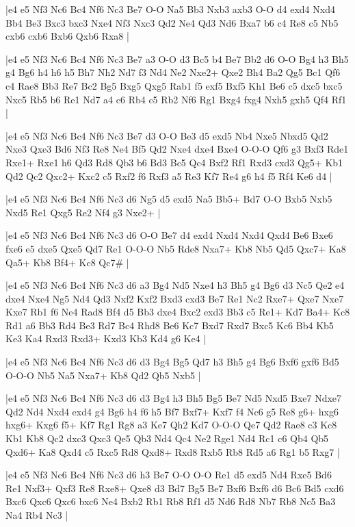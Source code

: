 \whitename{}
\blackname{}
\makegametitle
|e4 e5 Nf3 Nc6 Bc4 Nf6 Nc3 Be7 O-O Na5 Bb3 Nxb3 axb3 O-O d4 exd4 Nxd4 Bb4 Be3 Bxc3 bxc3 Nxe4 Nf3 Nxc3 Qd2 Ne4 Qd3 Nd6 Bxa7 b6 c4 Re8 c5 Nb5 cxb6 cxb6 Bxb6 Qxb6 Rxa8  |

\whitename{}
\blackname{}
\makegametitle
|e4 e5 Nf3 Nc6 Bc4 Nf6 Nc3 Be7 a3 O-O d3 Bc5 b4 Be7 Bb2 d6 O-O Bg4 h3 Bh5 g4 Bg6 h4 h6 h5 Bh7 Nh2 Nd7 f3 Nd4 Ne2 Nxe2+ Qxe2 Bh4 Ba2 Qg5 Bc1 Qf6 c4 Rae8 Bb3 Re7 Bc2 Bg5 Bxg5 Qxg5 Rab1 f5 exf5 Bxf5 Kh1 Be6 c5 dxc5 bxc5 Nxc5 Rb5 b6 Re1 Nd7 a4 c6 Rb4 c5 Rb2 Nf6 Rg1 Bxg4 fxg4 Nxh5 gxh5 Qf4 Rf1  |

\whitename{}
\blackname{}
\makegametitle
|e4 e5 Nf3 Nc6 Bc4 Nf6 Nc3 Be7 d3 O-O Be3 d5 exd5 Nb4 Nxe5 Nbxd5 Qd2 Nxe3 Qxe3 Bd6 Nf3 Re8 Ne4 Bf5 Qd2 Nxe4 dxe4 Bxe4 O-O-O Qf6 g3 Bxf3 Rde1 Rxe1+ Rxe1 h6 Qd3 Rd8 Qb3 b6 Bd3 Bc5 Qc4 Bxf2 Rf1 Rxd3 cxd3 Qg5+ Kb1 Qd2 Qc2 Qxc2+ Kxc2 c5 Rxf2 f6 Rxf3 a5 Re3 Kf7 Re4 g6 h4 f5 Rf4 Ke6 d4  |

\whitename{}
\blackname{}
\makegametitle
|e4 e5 Nf3 Nc6 Bc4 Nf6 Nc3 d6 Ng5 d5 exd5 Na5 Bb5+ Bd7 O-O Bxb5 Nxb5 Nxd5 Re1 Qxg5 Re2 Nf4 g3 Nxe2+  |

\whitename{}
\blackname{}
\makegametitle
|e4 e5 Nf3 Nc6 Bc4 Nf6 Nc3 d6 O-O Be7 d4 exd4 Nxd4 Nxd4 Qxd4 Be6 Bxe6 fxe6 e5 dxe5 Qxe5 Qd7 Re1 O-O-O Nb5 Rde8 Nxa7+ Kb8 Nb5 Qd5 Qxc7+ Ka8 Qa5+ Kb8 Bf4+ Kc8 Qc7\#  |

\whitename{}
\blackname{}
\makegametitle
|e4 e5 Nf3 Nc6 Bc4 Nf6 Nc3 d6 a3 Bg4 Nd5 Nxe4 h3 Bh5 g4 Bg6 d3 Nc5 Qe2 e4 dxe4 Nxe4 Ng5 Nd4 Qd3 Nxf2 Kxf2 Bxd3 cxd3 Be7 Re1 Nc2 Rxe7+ Qxe7 Nxe7 Kxe7 Rb1 f6 Ne4 Rad8 Bf4 d5 Bb3 dxe4 Bxc2 exd3 Bb3 c5 Re1+ Kd7 Ba4+ Kc8 Rd1 a6 Bb3 Rd4 Be3 Rd7 Bc4 Rhd8 Be6 Kc7 Bxd7 Rxd7 Bxc5 Kc6 Bb4 Kb5 Ke3 Ka4 Rxd3 Rxd3+ Kxd3 Kb3 Kd4 g6 Ke4  |

\whitename{}
\blackname{}
\makegametitle
|e4 e5 Nf3 Nc6 Bc4 Nf6 Nc3 d6 d3 Bg4 Bg5 Qd7 h3 Bh5 g4 Bg6 Bxf6 gxf6 Bd5 O-O-O Nb5 Na5 Nxa7+ Kb8 Qd2 Qb5 Nxb5  |

\whitename{}
\blackname{}
\makegametitle
|e4 e5 Nf3 Nc6 Bc4 Nf6 Nc3 d6 d3 Bg4 h3 Bh5 Bg5 Be7 Nd5 Nxd5 Bxe7 Ndxe7 Qd2 Nd4 Nxd4 exd4 g4 Bg6 h4 f6 h5 Bf7 Bxf7+ Kxf7 f4 Nc6 g5 Re8 g6+ hxg6 hxg6+ Kxg6 f5+ Kf7 Rg1 Rg8 a3 Ke7 Qh2 Kd7 O-O-O Qe7 Qd2 Rae8 c3 Kc8 Kb1 Kb8 Qc2 dxc3 Qxc3 Qe5 Qb3 Nd4 Qc4 Ne2 Rge1 Nd4 Rc1 c6 Qb4 Qb5 Qxd6+ Ka8 Qxd4 c5 Rxc5 Rd8 Qxd8+ Rxd8 Rxb5 Rb8 Rd5 a6 Rg1 b5 Rxg7  |

\whitename{}
\blackname{}
\makegametitle
|e4 e5 Nf3 Nc6 Bc4 Nf6 Nc3 d6 h3 Be7 O-O O-O Re1 d5 exd5 Nd4 Rxe5 Bd6 Re1 Nxf3+ Qxf3 Re8 Rxe8+ Qxe8 d3 Bd7 Bg5 Be7 Bxf6 Bxf6 d6 Bc6 Bd5 cxd6 Bxc6 Qxc6 Qxc6 bxc6 Ne4 Bxb2 Rb1 Rb8 Rf1 d5 Nd6 Rd8 Nb7 Rb8 Nc5 Ba3 Na4 Rb4 Nc3  |

